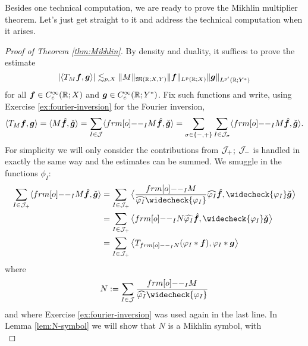 Besides one technical computation, we are ready to prove the Mikhlin multiplier theorem.
Let's just get straight to it and address the technical computation when it arises.

\begin{proof}[Proof of Theorem \ref{thm:Mikhlin}]
  By density and duality, it suffices to prove the estimate
  \begin{equation*}
    |\langle T_{M} \bm{f}, \bm{g} \rangle| \lesssim_{p,X} \|M\|_{\mathfrak{M}(\mathbb{R};X,Y)} \|\bm{f}\|_{L^p(\mathbb{R};X)} \|\bm{g}\|_{L^{p'}(\mathbb{R};Y^{*})}
  \end{equation*}
  for all $\bm{f} \in C_{c}^\infty(\mathbb{R};X)$ and $\bm{g} \in C_{c}^\infty(\mathbb{R};Y^*)$.
  Fix such functions and write, using Exercise \ref{ex:fourier-inversion} for the Fourier inversion,
  \begin{equation*}
    \langle T_{M} \mb{f}, \mb{g} \rangle
    = \langle M\hat{\mb{f}}, \check{\mb{g}} \rangle
    = \sum_{I \in \mc{J}} \langle \1_{I} M\hat{\mb{f}}, \check{\mb{g}} \rangle
    = \sum_{\sigma \in \{-,+\}} \sum_{I \in \mc{J}_{\sigma}} \langle \1_{I} M\hat{\mb{f}}, \check{\mb{g}} \rangle.
  \end{equation*}
  For simplicity we will only consider the contributions from $\mathcal{J}_{+}$; $\mathcal{J}_{-}$ is handled in exactly the same way and the estimates can be summed.
  We smuggle in the functions $\phi_{I}$:
  \begin{equation*}
    \begin{aligned}
    \sum_{I \in \mc{J}_{+}} \langle \1_{I} M\hat{\mb{f}}, \check{\mb{g}} \rangle
    &= \sum_{I \in \mc{J}_{+}} \big\langle \frac{\1_{I} M}{\widehat{\phi_{I}} \widecheck{\phi_{I}}} \widehat{\phi_{I}} \hat{\mb{f}}, \widecheck{\phi_{I}} \check{\mb{g}} \big\rangle \\
    &= \sum_{I \in \mc{J}_{+}} \big\langle \1_{I} N \widehat{\phi_{I}} \hat{\mb{f}}, \widecheck{\phi_{I}} \check{\mb{g}} \big\rangle \\
    &=\sum_{I \in \mc{J}_{+}} \big\langle T_{\1_{I} N} (\phi_{I} \ast \mb{f}) , \phi_{I} \ast \mb{g} \big\rangle
  \end{aligned}
  \end{equation*}
where
\begin{equation*}
  N := \sum_{I \in \mc{J}} \frac{\1_{I} M}{\widehat{\phi_{I}} \widecheck{\phi_{I}}}
\end{equation*}
and where Exercise \ref{ex:fourier-inversion} was used again in the last line.
In Lemma \ref{lem:N-symbol} we will show that $N$ is a Mikhlin symbol, with
\begin{equation}\label{eq:N-bound}

\end{equation}
\end{proof}

